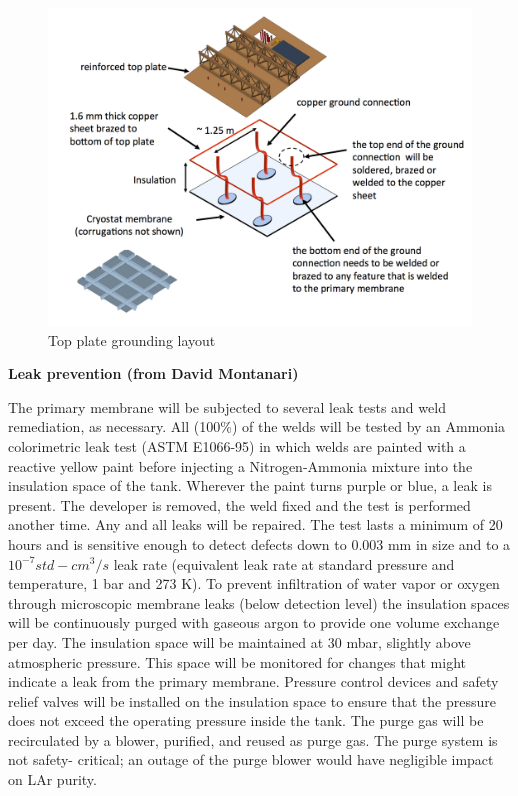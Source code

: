 \begin{figure}
\begin{center}
\includegraphics[width=.95\textwidth]{figures/cryostat-top-plate-gnd} %
\caption[Top plate grounding layout]{\label{fig:top-plate-gnd}Top plate grounding layout}
\end{center}
\end{figure}

\textbf{Leak prevention (from David Montanari)}

The primary membrane will be subjected to several leak tests and weld remediation, as necessary. All 
(100\%) of the welds will be tested by an Ammonia colorimetric leak test (ASTM E1066-95) in which 
welds are painted with a reactive yellow paint before injecting a Nitrogen-Ammonia mixture into the 
insulation space of the tank. Wherever the paint turns purple or blue, a leak is present. The developer is 
removed, the weld fixed and the test is performed another time. Any and all leaks will be repaired. The 
test lasts a minimum of 20 hours and is sensitive enough to detect defects down to 0.003 mm in size 
and to a $10^{-7} std-cm^3/s$ leak rate (equivalent leak rate at standard pressure and temperature, 1 bar and 
273 K). To prevent infiltration of water vapor or oxygen through microscopic membrane leaks (below 
detection level) the insulation spaces will be continuously purged with gaseous argon to provide one 
volume exchange per day. The insulation space will be maintained at 30 mbar, slightly above 
atmospheric pressure. This space will be monitored for changes that might indicate a leak from the 
primary membrane. Pressure control devices and safety relief valves will be installed on the insulation 
space to ensure that the pressure does not exceed the operating pressure inside the tank. The purge gas 
will be recirculated by a blower, purified, and reused as purge gas. The purge system is not safety-
critical; an outage of the purge blower would have negligible impact on LAr purity.

